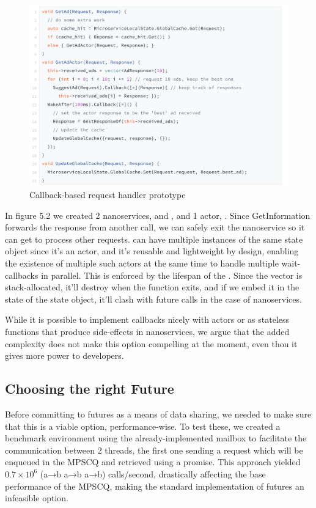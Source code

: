 \begin{figure}[H]
\includegraphics[width=1\linewidth]{content/fig/callbacks.png}
\caption{Callback-based request handler prototype}
\end{figure}

In figure 5.2 we created 2 nanoservices,  and , and 1 actor, . Since GetInformation forwards the response from another call, we can safely exit the  nanoservice so it can get to process other requests.
 can have multiple instances of the same state object since it's an actor, and it's reusable and lightweight by design, enabling the existence of multiple such actors at the same time to handle multiple wait-callbacks in parallel. This is enforced by the lifespan of the . Since the vector is stack-allocated, it'll destroy when the function exits, and if we embed it in the state of the state object, it'll clash with future calls in the case of nanoservices.

While it is possible to implement callbacks nicely with actors or as stateless functions that produce side-effects in nanoservices, we argue that the added complexity does not make this option compelling at the moment, even thou it gives more power to developers.

\subsection*{Choosing the right Future}
Before committing to futures as a means of data sharing, we needed to make sure that this is a viable option, performance-wise. To test these, we created a benchmark environment using the already-implemented mailbox to facilitate the communication between 2 threads, the first one sending a request which will be enqueued in the MPSCQ and retrieved using a promise.
This approach yielded $0.7 \times 10^6$ (a→b a→b a→b) calls/second, drastically affecting the base performance of the MPSCQ, making the standard implementation of futures an infeasible option.


